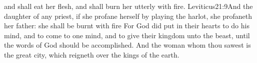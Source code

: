  and shall eat her flesh, and shall burn her utterly with fire.
		{Leviticus}{21:9}{And the daughter of any priest, if she profane herself by playing the harlot, she profaneth her father: she shall be burnt with fire}
 For God did put in their hearts to do his mind, and to come to one mind, and to give their kingdom unto the beast, until the words of God should be accomplished. 
 And the woman whom thou sawest is the great city, which reigneth over the kings of the earth.